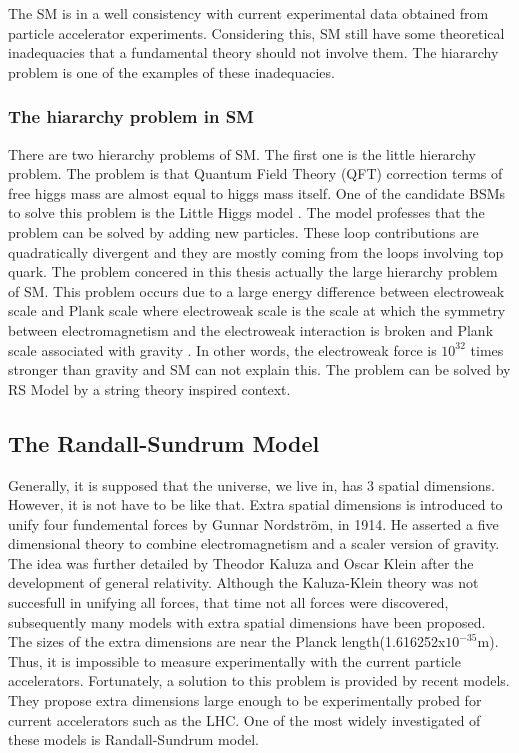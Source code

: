 \documentclass[12pt,oneandhalf,chaparabic,phys,ms,eng]{metu}
\begin{document}
The SM is in a well consistency with current experimental data obtained from particle accelerator experiments. Considering this, SM still have some theoretical inadequacies that a fundamental theory should not involve them. The  hiararchy problem is one of the examples of these inadequacies.

\subsubsection{The hiararchy problem in SM}
There are two hierarchy problems of SM. The first one is the little hierarchy problem.  The problem is that Quantum Field Theory (QFT) correction terms of free higgs mass are almost equal to higgs mass itself. One of the candidate BSMs to solve this problem is the Little Higgs model \cite{R6}. The model professes that the problem can be solved by adding new particles. These loop contributions are quadratically divergent and they are mostly coming from the loops involving top quark. The problem concered in this thesis actually the large hierarchy problem of SM. This problem occurs due to a large energy difference between electroweak scale and Plank scale where electroweak scale is the scale at which the symmetry between electromagnetism and the electroweak interaction is broken and Plank scale associated with gravity \cite{R7}. In other words, the electroweak force is $10^{32}$ times stronger than gravity and SM can not explain this. The problem can be solved by RS Model \cite{R30,R31} by a string theory inspired context.

\subsection{The Randall-Sundrum Model}

Generally, it is supposed that the universe, we live in, has 3 spatial dimensions. However, it is not have to be like that. Extra spatial dimensions is introduced to unify four fundemental forces by Gunnar Nordström, in 1914. He asserted a five dimensional theory to combine electromagnetism and a scaler version of gravity.  The idea \cite{R33} was further detailed by Theodor Kaluza and Oscar Klein after the development of general relativity. Although the Kaluza-Klein theory was not succesfull in unifying all forces, that time not all forces were discovered, subsequently many models with extra spatial dimensions have been proposed.  The sizes of the extra dimensions are near the Planck length(1.616252x$10^{-35} $m). Thus, it is impossible to measure experimentally with the current particle accelerators. Fortunately, a solution to this problem is provided by recent models. They propose extra dimensions large enough to be experimentally probed for current accelerators such as the LHC. One of the most widely investigated of these models is Randall-Sundrum model. 
 
\end{document}
